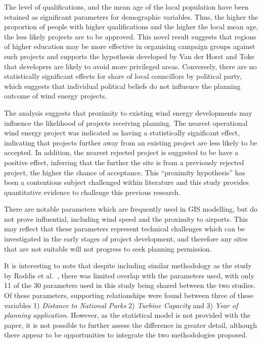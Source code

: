 \documentclass[a4paper,]{article}
\theoremstyle{definition}
\theoremstyle{definition}
\theoremstyle{definition}
\theoremstyle{remark}
\begin{document}
The level of qualifications, and the mean age of the local population have been retained as significant parameters for demographic variables. Thus, the higher the proportion of people with higher qualifications and the higher the local mean age, the less likely projects are to be approved. This novel result suggests that regions of higher education may be more effective in organising campaign groups against such projects and supports the hypothesis developed by Van der Horst and Toke \citep{VanderHorst2010} that developers are likely to avoid more privileged areas. Conversely, there are no statistically significant effects for share of local councillors by political party, which suggests that individual political beliefs do not influence the planning outcome of wind energy projects.

The analysis suggests that proximity to existing wind energy developments may influence the likelihood of projects receiving planning. The nearest operational wind energy project was indicated as having a statistically significant effect, indicating that projects further away from an existing project are less likely to be accepted. In addition, the nearest rejected project is suggested to be have a positive effect, inferring that the further the site is from a previously rejected project, the higher the chance of acceptance. This ``proximity hypothesis'' has been a contentious subject challenged within literature \citep{Meyerhoff2010, Ladenburg2008, Eltham2008} and this study provides quantitative evidence to challenge this previous research.

There are notable parameters which are frequently used in GIS modelling, but do not prove influential, including wind speed and the proximity to airports. This may reflect that these parameters represent technical challenges which can be investigated in the early stages of project development, and therefore any sites that are not suitable will not progress to seek planning permission.

It is interesting to note that despite including similar methodology as the study by Roddis et al.~\citeyearpar{Roddis2018}, there was limited overlap with the parameters used, with only 11 of the 30 parameters used in this study being shared between the two studies. Of these parameters, supporting relationships were found between three of these variables 1) \emph{Distance to National Parks} 2) \emph{Turbine Capacity} and 3) \emph{Year of planning application}. However, as the statistical model is not provided with the paper, it is not possible to further assess the difference in greater detail, although there appear to be opportunities to integrate the two methodologies proposed.
\end{document}
